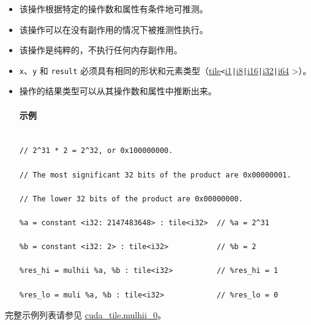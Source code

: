\documentclass{article}
\begin{document}
\begin{itemize}
\item 该操作根据特定的操作数和属性有条件地可推测。
\item 该操作可以在没有副作用的情况下被推测性执行。
\item 该操作是纯粹的，不执行任何内存副作用。
\item \texttt{x}、\texttt{y} 和 \texttt{result} 必须具有相同的形状和元素类型（\href{https://docs.nvidia.com/cuda/tile-ir/latest/sections/types.html#type-tile}{tile}\texttt{<}\href{https://docs.nvidia.com/cuda/tile-ir/latest/sections/types.html#subsection-element-types}{i1}\texttt{|}\href{https://docs.nvidia.com/cuda/tile-ir/latest/sections/types.html#subsection-element-types}{i8}\texttt{|}\href{https://docs.nvidia.com/cuda/tile-ir/latest/sections/types.html#subsection-element-types}{i16}\texttt{|}\href{https://docs.nvidia.com/cuda/tile-ir/latest/sections/types.html#subsection-element-types}{i32}\texttt{|}\href{https://docs.nvidia.com/cuda/tile-ir/latest/sections/types.html#subsection-element-types}{i64} >）。
\item 操作的结果类型可以从其操作数和属性中推断出来。




\paragraph{示例}


\begin{lstlisting}

// 2^31 * 2 = 2^32, or 0x100000000.

// The most significant 32 bits of the product are 0x00000001.

// The lower 32 bits of the product are 0x00000000.

%a = constant <i32: 2147483648> : tile<i32>  // %a = 2^31

%b = constant <i32: 2> : tile<i32>           // %b = 2

%res_hi = mulhii %a, %b : tile<i32>          // %res_hi = 1

%res_lo = muli %a, %b : tile<i32>            // %res_lo = 0

\end{lstlisting}



\end{itemize}
完整示例列表请参见 \href{https://docs.nvidia.com/cuda/tile-ir/latest/sections/appendix.html#example-cuda-tile-mulhii-0}{cuda\_tile.mulhii\_0}。
\end{document}
